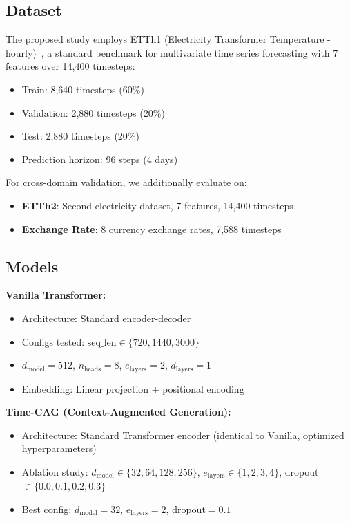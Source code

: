 \documentclass[10pt,twocolumn,letterpaper]{article}
\begin{document}
\subsection{Dataset}
The proposed study employs ETTh1 (Electricity Transformer Temperature - hourly)~\cite{ettdataset}, a standard benchmark for multivariate time series forecasting with 7 features over 14,400 timesteps:
\begin{itemize}
    \item Train: 8,640 timesteps (60\%)
    \item Validation: 2,880 timesteps (20\%)
    \item Test: 2,880 timesteps (20\%)
    \item Prediction horizon: 96 steps (4 days)
\end{itemize}

\noindent For cross-domain validation, we additionally evaluate on:
\begin{itemize}
    \item \textbf{ETTh2}: Second electricity dataset, 7 features, 14,400 timesteps
    \item \textbf{Exchange Rate}: 8 currency exchange rates, 7,588 timesteps
\end{itemize}

\subsection{Models}

\noindent\textbf{Vanilla Transformer:}
\begin{itemize}
    \item Architecture: Standard encoder-decoder
    \item Configs tested: $\text{seq\_len} \in \{720, 1440, 3000\}$
    \item $d_{\text{model}}=512$, $n_{\text{heads}}=8$, $e_{\text{layers}}=2$, $d_{\text{layers}}=1$
    \item Embedding: Linear projection + positional encoding
\end{itemize}

\noindent\textbf{Time-CAG (Context-Augmented Generation):}
\begin{itemize}
    \item Architecture: Standard Transformer encoder (identical to Vanilla, optimized hyperparameters)
    \item Ablation study: $d_{\text{model}} \in \{32, 64, 128, 256\}$, $e_{\text{layers}} \in \{1, 2, 3, 4\}$, dropout $\in \{0.0, 0.1, 0.2, 0.3\}$
    \item Best config: $d_{\text{model}}=32$, $e_{\text{layers}}=2$, dropout$=0.1$
\end{itemize}
\end{document}
